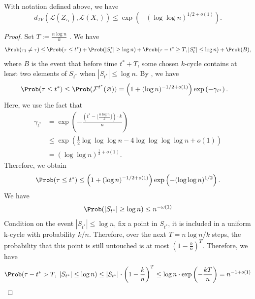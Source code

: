 \begin{lemma}
    With notation defined above, we have 
    $$d_{TV}(\mathcal{L}(Z_{\tau_1}),\mathcal{L}(X_{\tau}))\leq \exp\left(-(\log\log n)^{1/2+o(1)}\right).$$
\end{lemma}
\begin{proof}
    Set $T:=\frac{n\log n}{k}$ . We have 
    \begin{equation}
        \Prob(\tau_1\neq \tau) \leq \Prob(\tau\leq t^*)+\Prob(|S_t^*|\geq \log n)+\Prob(\tau-t^*\geq T,|S_t^*|\leq \log n)+\Prob(B),
    \end{equation}
    where $B$ is the event that before time $t^*+T$, some chosen $k$-cycle contains at least two elements of $S_{t^*}$ when $|S_{t^*}|\leq \log n$.
    By , we have 
    \begin{align*}
        \Prob(\tau\leq t^*) &\leq \Prob(\mathcal{F}^{t^*}(\varnothing)) =\left(1+(\log n)^{-1/2+o(1)}\right)\exp\left(-\gamma_{t^*}\right).
    \end{align*}
    Here, we use the fact that
    \begin{align*}
        \gamma_{t^*}&=\exp\left(-\frac{\left(t^*-\lfloor\frac{n\log n}{k}\rfloor\right)\cdot k}{n}\right) \\&\leq \exp\left(\frac{1}{2}\log\log\log n -4\log\log\log\log n+o(1)\right)\\
        &=\left(\log\log n\right)^{\frac{1}{2}+o(1)}.
    \end{align*}
    Therefore, we obtain
    \begin{equation}
        \Prob(\tau \leq t^*)\leq \left(1+(\log n)^{-1/2+o(1)}\right)\exp\left(-(\log\log n)^{1/2}\right).
    \end{equation}
    We have
    \begin{equation}
        \Prob(|S_{t^*}|\geq \log n) \leq n^{-\omega(1)}
    \end{equation}
    Condition on the event $|S_{t^*}|\leq \log n$, fix a point in $S_{t^*}$, it is included in a uniform k-cycle with probability $k/n$. Therefore, over the next $T=n\log n/k$ steps, the probability that this point is still untouched is at most $(1-\frac{k}{n})^T$. Therefore, we have
    \begin{equation}
        \Prob(\tau-t^* >T,\;|S_{t^*}|\leq \log n) \leq |S_{t^*}|\cdot \left(1-\frac{k}{n}\right)^T\leq \log n \cdot\exp\left(-\frac{kT}{n}\right) =n^{-1+o(1)}

\end{equation}
\end{proof}
